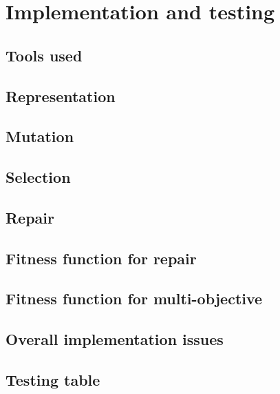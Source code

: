 \documentclass[a4paper,11pt]{article}
\begin{document}
\section{Implementation and testing}

\subsection{Tools used}

\subsection{Representation}
	
\subsection{Mutation}

\subsection{Selection}

\subsection{Repair}

\subsection{Fitness function for repair}

\subsection{Fitness function for multi-objective}

\subsection{Overall implementation issues}

\subsection{Testing table}
\end{document}
